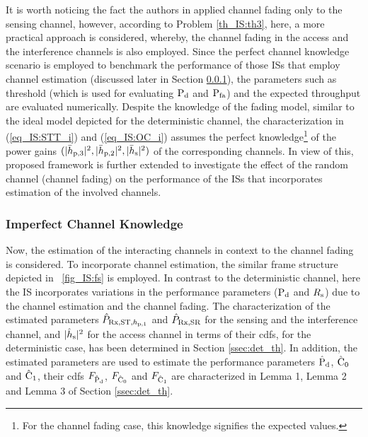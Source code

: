 \begin{remark} \label{rem_IS:rem1}
\normalfont

It is worth noticing the fact the authors in \cite{Juarez11} applied channel fading only to the sensing channel, however, according to Problem \ref{th_IS:th3}, here, a more practical approach is considered, whereby, the channel fading in the access and the interference channels is also employed. Since the perfect channel knowledge scenario is employed to benchmark the performance of those ISs that employ channel estimation (discussed later in Section \ref{ssec:ice}), the parameters such as threshold (which is used for evaluating $\text{P}_{\text{d}}$ and $\text{P}_{\text{fa}}$) and the expected throughput are evaluated numerically.
Despite the knowledge of the fading model, similar to the ideal model depicted for the deterministic channel, the characterization in (\ref{eq_IS:STT_i}) and (\ref{eq_IS:OC_i}) assumes the perfect knowledge\footnote{For the channel fading case, this knowledge signifies the expected values.} of the power gains $(|\bar{h}_{\text{p,3}}|^2, |\bar{h}_{\text{p,2}}|^2, |\bar{h}_{\text{s}}|^2)$ of the corresponding channels. In view of this, proposed framework is further extended to investigate the effect of the random channel (channel fading) on the performance of the ISs that incorporates estimation of the involved channels.


\end{remark}

\subsubsection{Imperfect Channel Knowledge} \label{ssec:ice}
Now, the estimation of the interacting channels in context to the channel fading is considered. To incorporate channel estimation, the similar frame structure depicted in \figurename~\ref{fig_IS:fs} is employed. In contrast to the deterministic channel, here the IS incorporates variations in the performance parameters ($\text{P}_{\text{d}}$ and $R_{\text{s}}$) due to the channel estimation and the channel fading. 
The characterization of the estimated parameters $\hat{P}_{\text{Rx,ST,$h_{\text{p,1}}$}}$ and $\hat{P}_{\text{Rx,SR}}$ for the sensing and the interference channel, and $|\hat{h}_{\text{s}}|^2$ for the access channel in terms of their cdfs, for the deterministic case, has been determined in Section \ref{ssec:det_th}. In addition, the estimated parameters are used to estimate the performance parameters $\hat{\text{P}}_{\text{d}}$, $\hat{\text{C}}_{\text{0}}$ and $\hat{\text{C}}_{\text{1}}$, their cdfs $F_{\hat{\text{P}}_{\text{d}}}$, $F_{\hat{\text{C}}_{\text{0}}}$ and $F_{\hat{\text{C}}_{\text{1}}}$ are characterized in Lemma 1, Lemma 2 and Lemma 3 of Section \ref{ssec:det_th}.

